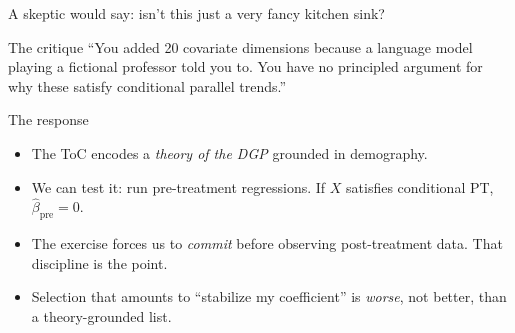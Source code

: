 \documentclass[aspectratio=169,12pt]{beamer}
\begin{document}
\begin{frame}{A skeptic would say: isn't this just a very fancy kitchen sink?}

\begin{alertblock}{The critique}
\footnotesize
``You added 20 covariate dimensions because a language model playing a fictional
professor told you to. You have no principled argument for why these satisfy
conditional parallel trends.''
\end{alertblock}

\vspace{0.15em}
\begin{exampleblock}{The response}
\begin{itemize}\footnotesize\setlength{\itemsep}{1pt}
  \item The ToC encodes a \emph{theory of the DGP} grounded in demography.
  \item We can test it: run pre-treatment regressions.
        If $X$ satisfies conditional PT, $\hat{\beta}_{\text{pre}} = 0$.
  \item The exercise forces us to \emph{commit} before observing post-treatment data.
        That discipline is the point.
  \item Selection that amounts to ``stabilize my coefficient'' is \emph{worse},
        not better, than a theory-grounded list.
\end{itemize}
\end{exampleblock}

\end{frame}
\end{document}
